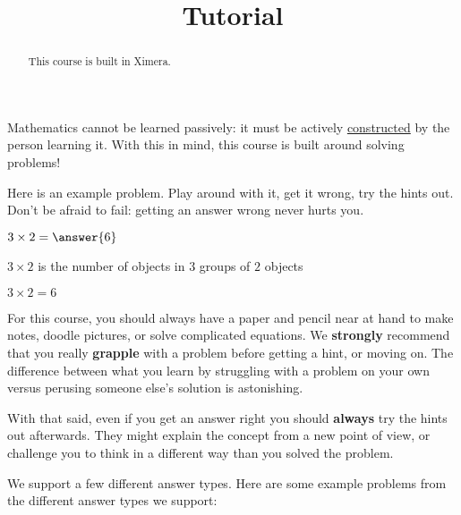 \documentclass{ximera}
\title{Tutorial}
\begin{document}
\begin{abstract}
  This course is built in Ximera.
\end{abstract}\maketitle

Mathematics cannot be learned passively: it must be actively
\href{http://en.wikipedia.org/wiki/Constructivism_(philosophy_of_education)}{constructed}
by the person learning it.  With this in mind, this course is built
around solving problems!

Here is an example problem.  Play around with it, get it wrong, try
the hints out.  Don't be afraid to fail: getting an answer wrong never
hurts you.

\begin{problem}
  $3\times 2 = \answer{6}$   
  \begin{hint}
    $3 \times 2$ is the number of objects in $3$ groups of $2$ objects
  \end{hint}
  \begin{hint}
  \end{hint}
  \begin{hint}
    $3\times 2=6$
  \end{hint}
\end{problem}

For this course, you should always have a paper and pencil near at
hand to make notes, doodle pictures, or solve complicated equations.
We \textbf{strongly} recommend that you really \textbf{grapple} with a
problem before getting a hint, or moving on.  The difference between
what you learn by struggling with a problem on your own versus
perusing someone else's solution is astonishing.

With that said, even if you get an answer right you should
\textbf{always} try the hints out afterwards.  They might explain the
concept from a new point of view, or challenge you to think in a
different way than you solved the problem.


We support a few different answer types. Here are some example
problems from the different answer types we support:
\end{document}
